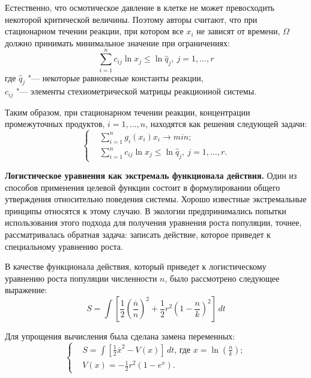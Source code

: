 \documentclass[12pt,a4paper,oneside]{book}
\begin{document}
Естественно, что осмотическое давление в клетке не может превосходить некоторой критической величины. Поэтому авторы считают, что при стационарном течении реакции, при котором все $x_i$ не зависят от времени, $\Omega$ должно принимать минимальное значение при ограничениях:
\begin{equation}
\sum_{i=1}^n c_{ij} \ln x_j \le \ln\widehat{q}_j, \ j=1, \dots, r 
\end{equation}
где $\widehat{q}_j$ "--- некоторые равновесные константы реакции,\\
$c_{ij}$ "--- элементы стехиометрической матрицы реакционной системы.

Таким образом, при стационарном течении реакции, концентрации промежуточных продуктов, $i=1,\dots, n$, находятся как решения следующей задачи:
\begin{equation}
	\label{feMinPress}
 \left\lbrace 
	\begin{aligned}
		&\sum_{i=1}^n g_i(x_i)x_i\to min;\\
		&\sum_{i=1}^n c_{ij} \ln x_j \le \ln\widehat{q}_j, \ j=1, \dots, r. 
	\end{aligned}
 \right.
\end{equation}

{\bf Логистическое уравнения как экстремаль функционала действия.} Один из способов применения целевой функции состоит в формулировании общего утверждения относительно поведения системы. Хорошо известные экстремальные принципы относятся к этому случаю. В экологии предпринимались попытки использования этого подхода для получения уравнения роста популяции, точнее, рассматривалась обратная задача: записать действие, которое приведет к специальному уравнению роста.
	
В качестве функционала действия, который приведет к логистическому уравнению роста популяции численности $n$, было рассмотрено следующее выражение:
\begin{equation}
S=\int \left[ \frac{1}{2} \left( \frac{\overset{.}{n}}{n} \right)^2+ \frac{1}{2} r^2 \left( 1- \frac{n}{k} \right)^2 \right] \,dt
\end{equation}

Для упрощения вычисления была сделана замена переменных:
\begin{equation}
\label{feMinPress1}
 \left\lbrace 
	\begin{aligned}
		&S=\int \left[ \frac{1}{2} \overset{.}{x}^2 - V(x) \right] \,dt \text{, где \ } x=\ln \left( \frac{n}{k} \right);\\
		&V(x)=-\frac{1}{2}r^2(1-e^x). 
	\end{aligned}
 \right.
\end{equation}
\end{document}
